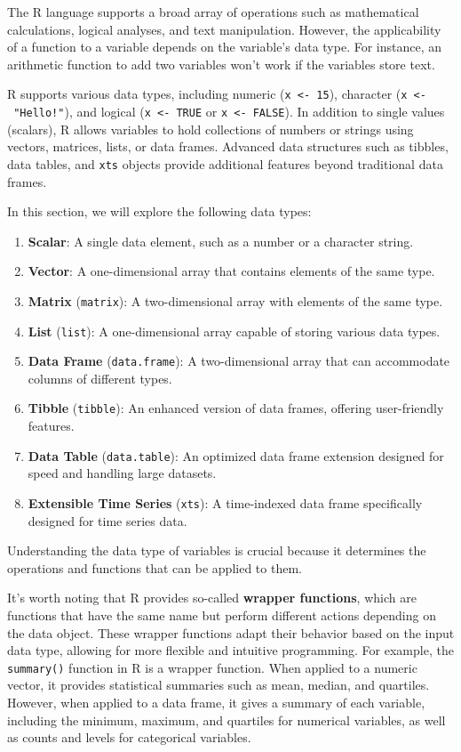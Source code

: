 \documentclass[
]{book}
\providecommand{\tightlist}{%
  \setlength{\itemsep}{0pt}\setlength{\parskip}{0pt}}
\begin{document}
The R language supports a broad array of operations such as mathematical calculations, logical analyses, and text manipulation. However, the applicability of a function to a variable depends on the variable's data type. For instance, an arithmetic function to add two variables won't work if the variables store text.

R supports various data types, including numeric (\texttt{x\ \textless{}-\ 15}), character (\texttt{x\ \textless{}-\ "Hello!"}), and logical (\texttt{x\ \textless{}-\ TRUE} or \texttt{x\ \textless{}-\ FALSE}). In addition to single values (scalars), R allows variables to hold collections of numbers or strings using vectors, matrices, lists, or data frames. Advanced data structures such as tibbles, data tables, and \texttt{xts} objects provide additional features beyond traditional data frames.

In this section, we will explore the following data types:

\begin{enumerate}
\def\labelenumi{\arabic{enumi}.}
\tightlist
\item
  \textbf{Scalar}: A single data element, such as a number or a character string.
\item
  \textbf{Vector}: A one-dimensional array that contains elements of the same type.
\item
  \textbf{Matrix} (\texttt{matrix}): A two-dimensional array with elements of the same type.
\item
  \textbf{List} (\texttt{list}): A one-dimensional array capable of storing various data types.
\item
  \textbf{Data Frame} (\texttt{data.frame}): A two-dimensional array that can accommodate columns of different types.
\item
  \textbf{Tibble} (\texttt{tibble}): An enhanced version of data frames, offering user-friendly features.
\item
  \textbf{Data Table} (\texttt{data.table}): An optimized data frame extension designed for speed and handling large datasets.
\item
  \textbf{Extensible Time Series} (\texttt{xts}): A time-indexed data frame specifically designed for time series data.
\end{enumerate}

Understanding the data type of variables is crucial because it determines the operations and functions that can be applied to them.

It's worth noting that R provides so-called \textbf{wrapper functions}, which are functions that have the same name but perform different actions depending on the data object. These wrapper functions adapt their behavior based on the input data type, allowing for more flexible and intuitive programming. For example, the \texttt{summary()} function in R is a wrapper function. When applied to a numeric vector, it provides statistical summaries such as mean, median, and quartiles. However, when applied to a data frame, it gives a summary of each variable, including the minimum, maximum, and quartiles for numerical variables, as well as counts and levels for categorical variables.
\end{document}
